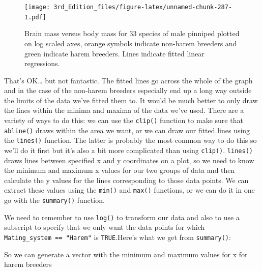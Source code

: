 \documentclass[
]{book}
\newenvironment{Shaded}{\begin{snugshade}}{\end{snugshade}}
\newcommand{\FloatTok}[1]{\textcolor[rgb]{0.00,0.00,0.81}{#1}}
\newcommand{\KeywordTok}[1]{\textcolor[rgb]{0.13,0.29,0.53}{\textbf{#1}}}
\newcommand{\NormalTok}[1]{#1}
\newcommand{\OperatorTok}[1]{\textcolor[rgb]{0.81,0.36,0.00}{\textbf{#1}}}
\newcommand{\StringTok}[1]{\textcolor[rgb]{0.31,0.60,0.02}{#1}}
\begin{document}
\begin{figure}
\centering
\texttt{[image: 3rd\_Edition\_files/figure-latex/unnamed-chunk-287-1.pdf]}
\caption{\label{fig:unnamed-chunk-287}Brain mass versus body mass for 33 species of male pinniped plotted on log scaled axes, orange symbols indicate non-harem breeders and green indicate harem breeders. Lines indicate fitted linear regressions.}
\end{figure}

That's OK\ldots{} but not fantastic. The fitted lines go across the whole of the graph and in the case of the non-harem breeders especially end up a long way outside the limits of the data we've fitted them to. It would be much better to only draw the lines within the minima and maxima of the data we've used. There are a variety of ways to do this: we can use the \texttt{clip()} function to make sure that \texttt{abline()} draws within the area we want, or we can draw our fitted lines using the \texttt{lines()} function. The latter is probably the most common way to do this so we'll do it first but it's also a bit more complicated than using \texttt{clip()}. \texttt{lines()} draws lines between specified x and y coordinates on a plot, so we need to know the minimum and maximum x values for our two groups of data and then calculate the y values for the lines corresponding to those data points. We can extract these values using the \texttt{min()} and \texttt{max()} functions, or we can do it in one go with the \texttt{summary()} function.

We need to remember to use \texttt{log()} to transform our data and also to use a subscript to specify that we only want the data points for which \texttt{Mating\_system\ ==\ "Harem"} is \texttt{TRUE}.Here's what we get from \texttt{summary()}:

\begin{Shaded}
\end{Shaded}

So we can generate a vector with the minimum and maximum values for x for harem breeders
\end{document}
